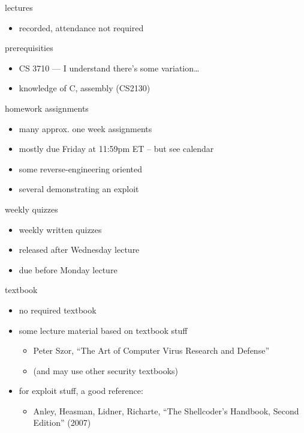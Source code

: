 \begin{frame}{lectures}
    \begin{itemize}
    \item recorded, attendance not required
    \end{itemize}
\end{frame}

\begin{frame}{prerequisities}
    \begin{itemize}
    \item CS 3710 --- I understand there's some variation\ldots
    \item knowledge of C, assembly (CS2130)
    \end{itemize}
\end{frame}

\begin{frame}{homework assignments}
\begin{itemize}
    \item many approx. one week assignments
    \item mostly due Friday at 11:59pm ET -- but see calendar
    \vspace{.5cm}
    \item some reverse-engineering oriented
    \item several demonstrating an exploit
\end{itemize}
\end{frame}

\begin{frame}{weekly quizzes}
\begin{itemize}
    \item weekly written quizzes
    \item released after Wednesday lecture
    \item due before Monday lecture
\end{itemize}
\end{frame}

\begin{frame}{textbook}
\begin{itemize}
    \item no required textbook
    \vspace{.5cm}
    \item some lecture material based on textbook stuff
        \begin{itemize}
        \item Peter Szor, ``The Art of Computer Virus Research and Defense''
        \item (and may use other security textbooks)
        \end{itemize}
    \item for exploit stuff, a good reference:
        \begin{itemize}
        \item Anley, Heasman, Lidner, Richarte, ``The Shellcoder's Handbook, Second Edition'' (2007)
        \end{itemize}
    \end{itemize}
\end{frame}

